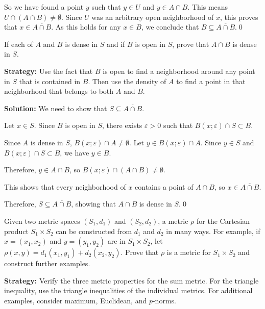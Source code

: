 So we have found a point $y$ such that $y \in U$ and $y \in A \cap B$. This means $U \cap (A \cap B) \neq \emptyset$.
Since $U$ was an arbitrary open neighborhood of $x$, this proves that $x \in \overline{A \cap B}$.
As this holds for any $x \in B$, we conclude that $B \subseteq \overline{A \cap B}$.\qed


\begin{problembox}
If each of \( A \) and \( B \) is dense in \( S \) and if \( B \) is open in \( S \), prove that \( A \cap B \) is dense in \( S \).
\end{problembox}

\noindent\textbf{Strategy:} Use the fact that $B$ is open to find a neighborhood around any point in $S$ that is contained in $B$. Then use the density of $A$ to find a point in that neighborhood that belongs to both $A$ and $B$.

\bigskip\noindent\textbf{Solution:} We need to show that $S \subseteq \overline{A \cap B}$.

Let $x \in S$. Since $B$ is open in $S$, there exists $\varepsilon > 0$ such that $B(x;\varepsilon) \cap S \subset B$.

Since $A$ is dense in $S$, $B(x;\varepsilon) \cap A \neq \emptyset$. Let $y \in B(x;\varepsilon) \cap A$. Since $y \in S$ and $B(x;\varepsilon) \cap S \subset B$, we have $y \in B$.

Therefore, $y \in A \cap B$, so $B(x;\varepsilon) \cap (A \cap B) \neq \emptyset$.

This shows that every neighborhood of $x$ contains a point of $A \cap B$, so $x \in \overline{A \cap B}$.

Therefore, $S \subseteq \overline{A \cap B}$, showing that $A \cap B$ is dense in $S$.\qed


\begin{problembox}
Given two metric spaces \((S_1, d_1)\) and \((S_2, d_2)\), a metric \( \rho \) for the Cartesian product \( S_1 \times S_2 \) can be constructed from \( d_1 \) and \( d_2 \) in many ways. For example, if \( x = (x_1, x_2) \) and \( y = (y_1, y_2) \) are in \( S_1 \times S_2 \), let \( \rho(x, y) = d_1(x_1, y_1) + d_2(x_2, y_2) \). Prove that \( \rho \) is a metric for \( S_1 \times S_2 \) and construct further examples.
\end{problembox}

\noindent\textbf{Strategy:} Verify the three metric properties for the sum metric. For the triangle inequality, use the triangle inequalities of the individual metrics. For additional examples, consider maximum, Euclidean, and $p$-norms.

